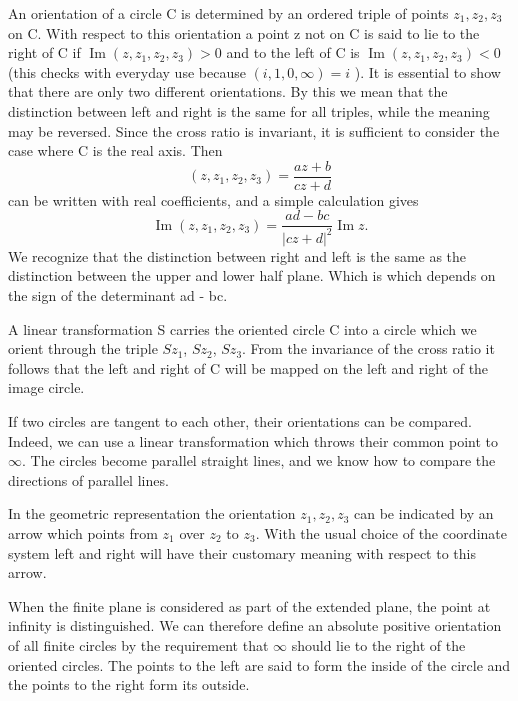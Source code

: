 An orientation of a circle C is determined by an ordered triple of points $z_{1}, z_{2}, z_{3}$ on C. With respect to this orientation a point z not on C is said to lie to the right of C if $\operatorname{Im}(z, z_{1}, z_{2}, z_{3}) > 0$ and to the left of C is $\operatorname{Im}(z, z_{1}, z_{2}, z_{3}) < 0$ (this checks with everyday use because $(i, 1, 0, \infty) = i$ ). It is essential to show that there are only two different orientations. By this we mean that the distinction between left and right is the same for all triples, while the meaning may be reversed. Since the cross ratio is invariant, it is sufficient to consider the case where C is the real axis. Then
\begin{equation*}
(z, z _ {1}, z _ {2}, z _ {3}) = \frac {a z + b}{c z + d}
\end{equation*}
can be written with real coefficients, and a simple calculation gives
\begin{equation*}
\operatorname{Im} \left(z, z _ {1}, z _ {2}, z _ {3}\right) = \frac {a d - b c}{| c z + d | ^ {2}} \operatorname{Im} z.
\end{equation*}
We recognize that the distinction between right and left is the same as the distinction between the upper and lower half plane. Which is which depends on the sign of the determinant ad - bc.


A linear transformation S carries the oriented circle C into a circle which we orient through the triple $Sz_{1}$, $Sz_{2}$, $Sz_{3}$. From the invariance of the cross ratio it follows that the left and right of C will be mapped on the left and right of the image circle.

If two circles are tangent to each other, their orientations can be compared. Indeed, we can use a linear transformation which throws their common point to $\infty$. The circles become parallel straight lines, and we know how to compare the directions of parallel lines.

In the geometric representation the orientation $z_{1}, z_{2}, z_{3}$ can be indicated by an arrow which points from $z_{1}$ over $z_{2}$ to $z_{3}$. With the usual choice of the coordinate system left and right will have their customary meaning with respect to this arrow.

When the finite plane is considered as part of the extended plane, the point at infinity is distinguished. We can therefore define an absolute positive orientation of all finite circles by the requirement that $\infty$ should lie to the right of the oriented circles. The points to the left are said to form the inside of the circle and the points to the right form its outside.

